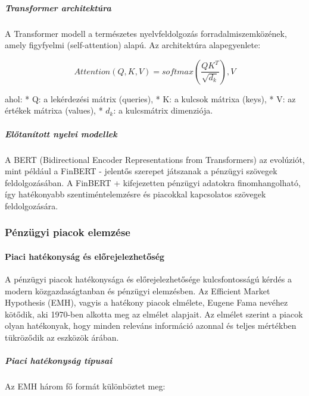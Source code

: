 \documentclass[11pt]{article}
\begin{document}
\subparagraph{Transformer
architektúra}\label{transformer-architektuxfara}

A Transformer modell a természetes nyelvfeldolgozás
forradalmiszemközének, amely figyfyelmi (self-attention) alapú. Az
architektúra alapegyenlete:

\[Attention(Q,K,V) = softmax(\frac{QK^T}{\sqrt{d_k}}),V\]

ahol: * Q: a lekérdezési mátrix (queries), * K: a kulcsok mátrixa
(keys), * V: az értékek mátrixa (values), * \(d_k\): a kulcsmátrix
dimenziója.

\subparagraph{Előtanított nyelvi
modellek}\label{elux151tanuxedtott-nyelvi-modellek}

A BERT (Bidirectional Encoder Representations from Transformers) az
evolúziót, mint például a FinBERT - jelentős szerepet játszanak a
pénzügyi szövegek feldolgozásában. A FinBERT + kifejezetten pénzügyi
adatokra finomhangolható, így hatékonyabb szentiméntelemzésre és
piacokkal kapcsolatos szövegek feldolgozására.

\subsubsection{Pénzügyi piacok
elemzése}\label{puxe9nzuxfcgyi-piacok-elemzuxe9se}

\paragraph{Piaci hatékonyság és
előrejelezhetőség}\label{piaci-hatuxe9konysuxe1g-uxe9s-elux151rejelezhetux151suxe9g}

A pénzügyi piacok hatékonysága és előrejelezhetősége kulcsfontosságú
kérdés a modern közgazdaságtanban és pénzügyi elemzésben. Az Efficient
Market Hypothesis (EMH), vagyis a hatékony piacok elmélete, Eugene Fama
nevéhez kötődik, aki 1970-ben alkotta meg az elmélet alapjait. Az
elmélet szerint a piacok olyan hatékonyak, hogy minden releváns
információ azonnal és teljes mértékben tükröződik az eszközök árában.

\subparagraph{Piaci hatékonyság
típusai}\label{piaci-hatuxe9konysuxe1g-tuxedpusai}

Az EMH három fő formát különböztet meg:
\end{document}
